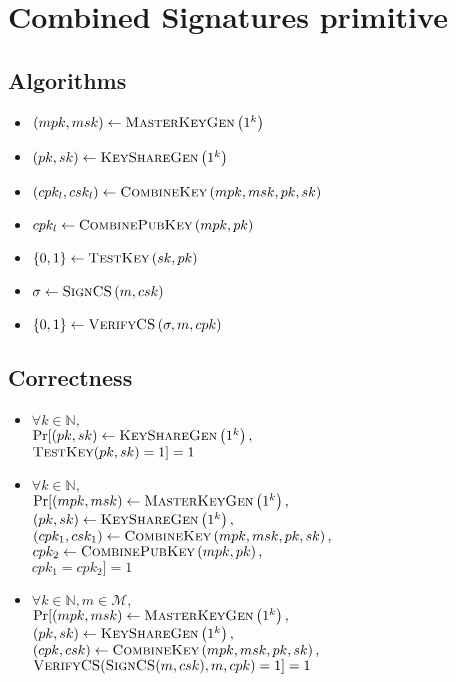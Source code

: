 \section{Combined Signatures primitive}
  \label{appendix:combinedsign}
  \subsection{Algorithms}
    \begin{itemize}
      \item $\left(mpk, msk\right) \gets \textsc{MasterKeyGen}\left(1^k\right)$
      \item $\left(pk, sk\right) \gets \textsc{KeyShareGen}\left(1^k\right)$
      \item $\left(cpk_l, csk_l\right) \gets \textsc{CombineKey}\left(mpk,
      msk, pk, sk\right)$
      \item $cpk_l \gets \textsc{CombinePubKey}\left(mpk, pk\right)$
      \item $\{0, 1\} \gets \textsc{TestKey}\left(sk, pk\right)$
      \item $\sigma \gets \textsc{SignCS}\left(m, csk\right)$
      \item $\left\{0, 1\right\} \gets \textsc{VerifyCS}\left(\sigma, m,
      cpk\right)$
    \end{itemize}

  \subsection{Correctness}
    \begin{itemize}
      \item $\forall k \in \mathbb{N},$ \\
      $\Pr[\left(pk, sk\right) \gets \textsc{KeyShareGen}\left(1^k\right),$ \\
      $\textsc{TestKey}(pk, sk) = 1] = 1$

      \item $\forall k \in \mathbb{N},$ \\
      $\Pr[(mpk, msk) \gets \textsc{MasterKeyGen}\left(1^k\right),$ \\
      $\left(pk, sk\right) \gets \textsc{KeyShareGen}\left(1^k\right),$ \\
      $\left(cpk_1, csk_1\right) \gets \textsc{CombineKey}\left(mpk, msk, pk,
      sk\right),$ \\
      $cpk_2 \gets \textsc{CombinePubKey}\left(mpk, pk\right),$ \\
      $cpk_1 = cpk_2] = 1$

      \item $\forall k \in \mathbb{N}, m \in \mathcal{M},$ \\
      $\Pr[(mpk, msk) \gets \textsc{MasterKeyGen}\left(1^k\right),$ \\
      $\left(pk, sk\right) \gets \textsc{KeyShareGen}\left(1^k\right),$ \\
      $\left(cpk, csk\right) \gets \textsc{CombineKey}\left(mpk, msk, pk,
      sk\right),$ \\
      $\textsc{VerifyCS}(\textsc{SignCS}(m, csk), m, cpk) = 1] = 1$
    \end{itemize}

